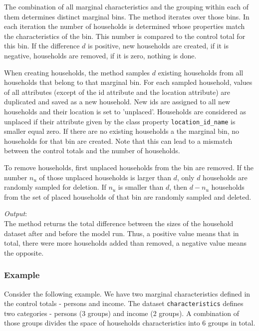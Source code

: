 The combination of all marginal characteristics and the grouping within each
of them determines distinct marginal bins.  The method iterates over those
bins. In each iteration the number of households is determined whose
properties match the characteristics of the bin. This number is compared to
the control total for this bin. If the difference $d$ is positive, new
households are created, if it is negative, households are removed, if it is
zero, nothing is done.

When creating households, the method samples $d$ existing households from all 
households that belong to that marginal bin. For each sampled household, values of all attributes 
(except of the id attribute and the location attribute)
are duplicated and saved as a new household. New ids are assigned 
to all new households and their location is set to 'unplaced'.  
Households are considered as unplaced if their
attribute \attributesindex given by the class property \verb|location_id_name|
is smaller equal zero. If there are no existing households a the marginal bin,
no households for that bin are created. Note that this can lead to a mismatch 
between the control totals and the number of households. 

To remove households, first unplaced households from the bin are removed. If
the number $n_u$ of those unplaced households is larger than $d$, only $d$
households are randomly sampled for deletion. If $n_u$ is smaller than $d$,
then $d-n_u$ households from the set of placed households of that bin are
randomly sampled and deleted. 

{\it Output}:~\\[1mm]
The method returns the total difference between the sizes of the household
dataset \datasetindex after and before the model \modelsindex run. Thus, a positive value means that in
total, there were more households added than removed, a negative value means
the opposite.

%
\subsubsection{Example}
%
Consider the following example. We have two marginal characteristics defined
in the control totals - persons and income. The dataset \datasetindex \verb|characteristics|
defines two categories - persons (3 groups) and income (2 groups). 
A combination of those groups divides the space of households
characteristics into 6 groups in total.


